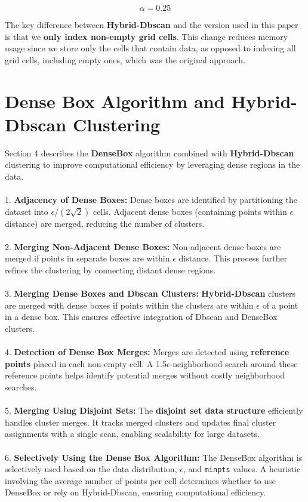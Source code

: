 \documentclass{article}
\begin{document}
\[
\alpha = 0.25
\]

The key difference between \textbf{Hybrid-Dbscan} and the version used in this paper is that we \textbf{only index non-empty grid cells}. This change reduces memory usage since we store only the cells that contain data, as opposed to indexing all grid cells, including empty ones, which was the original approach.

\section{Dense Box Algorithm and Hybrid-Dbscan Clustering}

Section 4 describes the \textbf{DenseBox} algorithm combined with \textbf{Hybrid-Dbscan} clustering to improve computational efficiency by leveraging dense regions in the data. \\ \\
1. \textbf{Adjacency of Dense Boxes: }
Dense boxes are identified by partitioning the dataset into $\epsilon/(2\sqrt{2})$ cells. Adjacent dense boxes (containing points within $\epsilon$ distance) are merged, reducing the number of clusters. \\ \\ 
2. \textbf{Merging Non-Adjacent Dense Boxes: } 
Non-adjacent dense boxes are merged if points in separate boxes are within $\epsilon$ distance. This process further refines the clustering by connecting distant dense regions. \\ \\
3. \textbf{Merging Dense Boxes and Dbscan Clusters: }
\textbf{Hybrid-Dbscan} clusters are merged with dense boxes if points within the clusters are within $\epsilon$ of a point in a dense box. This ensures effective integration of Dbscan and DenseBox clusters. \\\\
4. \textbf{Detection of Dense Box Merges: }
Merges are detected using \textbf{reference points} placed in each non-empty cell. A 1.5$\epsilon$-neighborhood search around these reference points helps identify potential merges without costly neighborhood searches. \\ \\
5. \textbf{Merging Using Disjoint Sets: }
The \textbf{disjoint set data structure} efficiently handles cluster merges. It tracks merged clusters and updates final cluster assignments with a single scan, enabling scalability for large datasets. \\ \\ 
6. \textbf{Selectively Using the Dense Box Algorithm: } 
The DenseBox algorithm is selectively used based on the data distribution, $\epsilon$, and \texttt{minpts} values. A heuristic involving the average number of points per cell determines whether to use DenseBox or rely on Hybrid-Dbscan, ensuring computational efficiency.
\end{document}
